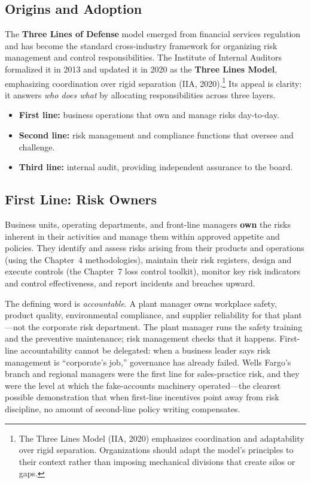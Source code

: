 \documentclass[11pt,openany]{book}
\providecommand{\tightlist}{\setlength{\itemsep}{0pt}\setlength{\parskip}{0pt}}
\begin{document}
\subsection{Origins and Adoption}

The \textbf{Three Lines of Defense} model emerged from financial services
regulation and has become the standard cross-industry framework for
organizing risk management and control responsibilities. The Institute of
Internal Auditors formalized it in 2013 and updated it in 2020 as the
\textbf{Three Lines Model}, emphasizing coordination over rigid separation
(IIA, 2020).\footnote{The Three Lines Model (IIA, 2020) emphasizes
coordination and adaptability over rigid separation. Organizations should
adapt the model's principles to their context rather than imposing mechanical
divisions that create silos or gaps.} Its appeal is clarity: it answers
\emph{who does what} by allocating responsibilities across three layers.

\begin{itemize}\tightlist
  \item \textbf{First line:} business operations that own and manage risks
        day-to-day.
  \item \textbf{Second line:} risk management and compliance functions that
        oversee and challenge.
  \item \textbf{Third line:} internal audit, providing independent assurance
        to the board.
\end{itemize}

\subsection{First Line: Risk Owners}

Business units, operating departments, and front-line managers \textbf{own}
the risks inherent in their activities and manage them within approved
appetite and policies. They identify and assess risks arising from their
products and operations (using the Chapter~4 methodologies), maintain their
risk registers, design and execute controls (the Chapter~7 loss control
toolkit), monitor key risk indicators and control effectiveness, and report
incidents and breaches upward.

The defining word is \emph{accountable}. A plant manager owns workplace
safety, product quality, environmental compliance, and supplier reliability
for that plant---not the corporate risk department. The plant manager runs
the safety training and the preventive maintenance; risk management checks
that it happens. First-line accountability cannot be delegated: when a
business leader says risk management is ``corporate's job,'' governance has
already failed. Wells Fargo's branch and regional managers were the first
line for sales-practice risk, and they were the level at which the
fake-accounts machinery operated---the clearest possible demonstration that
when first-line incentives point away from risk discipline, no amount of
second-line policy writing compensates.
\end{document}
